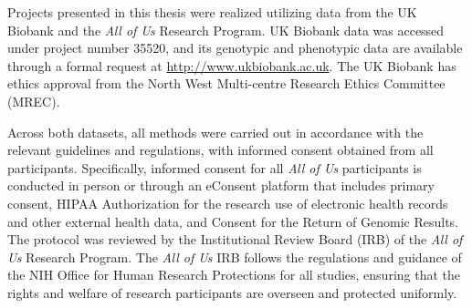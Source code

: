 \documentclass[draft,final]{istaustriathesis}
\begin{document}
\begin{ethicalstatement}
Projects presented in this thesis were realized utilizing data from the UK Biobank and the \textit{All of Us} Research Program. UK Biobank data was accessed under project number 35520, and its genotypic and phenotypic data are available through a formal request at \url{http://www.ukbiobank.ac.uk}. The UK Biobank has ethics approval from the North West Multi-centre Research Ethics Committee (MREC).

Across both datasets, all methods were carried out in accordance with the relevant guidelines and regulations, with informed consent obtained from all participants. Specifically, informed consent for all \textit{All of Us} participants is conducted in person or through an eConsent platform that includes primary consent, HIPAA Authorization for the research use of electronic health records and other external health data, and Consent for the Return of Genomic Results. The protocol was reviewed by the Institutional Review Board (IRB) of the \textit{All of Us} Research Program. The \textit{All of Us} IRB follows the regulations and guidance of the NIH Office for Human Research Protections for all studies, ensuring that the rights and welfare of research participants are overseen and protected uniformly.
\end{ethicalstatement}

\cleardoublepage
\renewcommand{\contentsname}{Table of Contents} %
\tableofcontents
\cleardoublepage
\listoffigures
\end{document}
